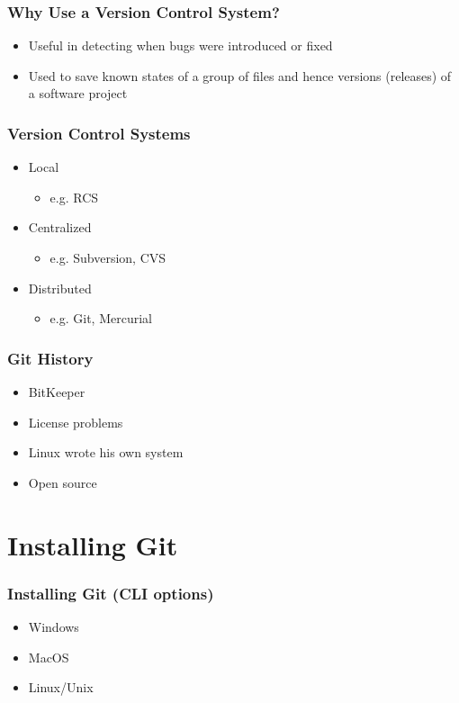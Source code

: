 \documentclass{git_course}
\begin{document}
\begin{frame}
\frametitle{Why Use a Version Control System?}
\begin{itemize}
    \item Useful in detecting when bugs were introduced or fixed
    \item Used to save known states of a group of files and hence versions
        (releases) of a software project
\end{itemize}
\end{frame}

\begin{frame}
\frametitle{Version Control Systems}
\begin{itemize}
    \item Local
    \begin{itemize}
        \item e.g. RCS
    \end{itemize}
    \item Centralized
    \begin{itemize}
        \item e.g. Subversion, CVS
    \end{itemize}
    \item Distributed
    \begin{itemize}
        \item e.g. Git, Mercurial
    \end{itemize}
\end{itemize}
\end{frame}

\begin{frame}
\frametitle{Git History}
\begin{itemize}
    \item BitKeeper
    \item License problems
    \item Linux wrote his own system
    \item Open source
\end{itemize}
\end{frame}


\section{Installing Git}

\begin{frame}
\frametitle{Installing Git (CLI options)}
\begin{itemize}
    \item Windows
    \item MacOS
    \item Linux/Unix
\end{itemize}
\end{frame}
\end{document}
